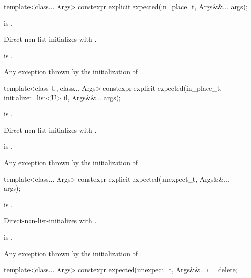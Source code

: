 %
\begin{itemdecl}
template<class... Args>
  constexpr explicit expected(in_place_t, Args&&... args);
\end{itemdecl}

\begin{itemdescr}
\pnum
\constraints
{} is .

\pnum
\effects
Direct-non-list-initializes  with .

\pnum
\ensures
{} is .

\pnum
\throws
Any exception thrown by the initialization of .
\end{itemdescr}

%
\begin{itemdecl}
template<class U, class... Args>
  constexpr explicit expected(in_place_t, initializer_list<U> il, Args&&... args);
\end{itemdecl}

\begin{itemdescr}
\pnum
\constraints
{} is .

\pnum
\effects
Direct-non-list-initializes  with .

\pnum
\ensures
{} is .

\pnum
\throws
Any exception thrown by the initialization of .
\end{itemdescr}

%
\begin{itemdecl}
template<class... Args>
  constexpr explicit expected(unexpect_t, Args&&... args);
\end{itemdecl}

\begin{itemdescr}
\pnum
\constraints
{} is .

\pnum
\effects
Direct-non-list-initializes  with .

\pnum
\ensures
{} is .

\pnum
\throws
Any exception thrown by the initialization of .
\end{itemdescr}

%
\begin{itemdecl}
template<class... Args>
  constexpr expected(unexpect_t, Args&&...) = delete;
\end{itemdecl}

